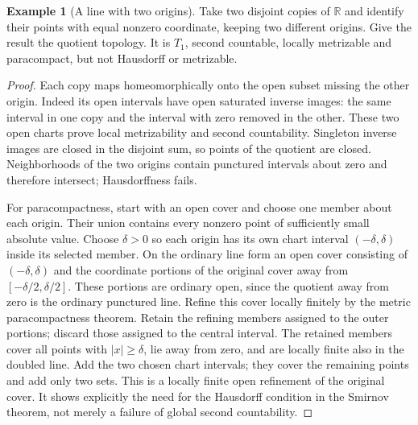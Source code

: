 \documentclass[11pt,oneside,openany]{book}
\theoremstyle{definition}
\newtheorem{example}[theorem]{Example}
\theoremstyle{remark}
\newcommand{\R}{\mathbb R}\newcommand{\C}{\mathbb C}
\begin{document}
\begin{example}[A line with two origins]\label{d10:18:two-origins}
Take two disjoint copies of $\R$ and identify their points with
equal nonzero coordinate, keeping two different origins.
Give the result the quotient topology. It is $T_1$, second countable,
locally metrizable and paracompact, but not Hausdorff or metrizable.
\end{example}
\begin{proof}
Each copy maps homeomorphically onto the open subset missing the
other origin. Indeed its open intervals have open saturated inverse
images: the same interval in one copy and the interval with zero
removed in the other. These two open charts prove local
metrizability and second countability. Singleton inverse images
are closed in the disjoint sum, so points of the quotient are closed.
Neighborhoods of the two origins contain punctured intervals about
zero and therefore intersect; Hausdorffness fails.

For paracompactness, start with an open cover and choose one member
about each origin. Their union contains every nonzero point of
sufficiently small absolute value. Choose $\delta>0$ so each origin
has its own chart interval $(-\delta,\delta)$ inside its selected
member. On the ordinary line form an open cover consisting of
$(-\delta,\delta)$ and the coordinate portions of the original
cover away from $[-\delta/2,\delta/2]$. These portions are ordinary
open, since the quotient away from zero is the ordinary punctured
line. Refine this cover locally finitely by the metric
paracompactness theorem. Retain the refining members assigned to
the outer portions; discard those assigned to the central interval.
The retained members cover all points with $|x|\geq\delta$, lie
away from zero, and are locally finite also in the doubled line.
Add the two chosen chart intervals; they cover the remaining
points and add only two sets. This is a locally finite open
refinement of the original cover.
It shows explicitly the need for the Hausdorff condition in the
Smirnov theorem, not merely a failure of global second countability.
\end{proof}
\end{document}
